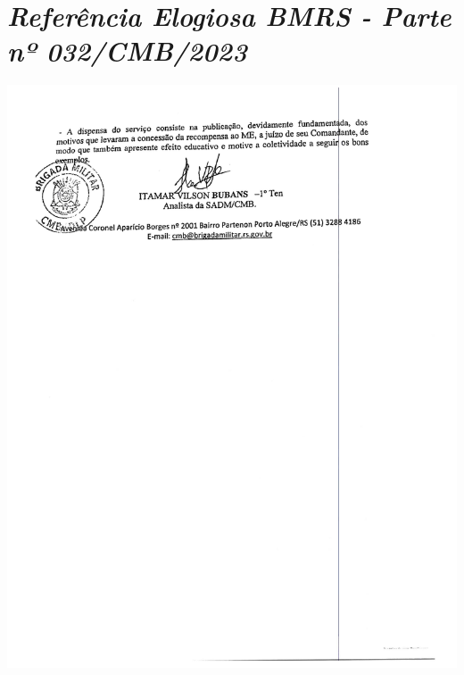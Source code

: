 \chapter{\textit{Referência Elogiosa BMRS - Parte nº 032/CMB/2023}}

\label{sec:anexof}
\includegraphics[scale=0.8]{imagens/PORTARIA-INTERNA-BMRS-2.pdf}

